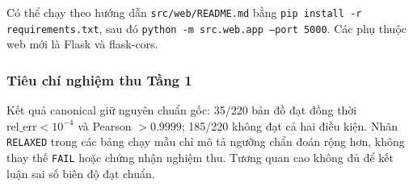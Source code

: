 Có thể chạy theo hướng dẫn \texttt{src/web/README.md} bằng
\texttt{pip install -r requirements.txt}, sau đó
\texttt{python -m src.web.app --port 5000}. Các phụ thuộc web mới là Flask và
flask-cors.

\subsubsection{Tiêu chí nghiệm thu Tầng 1}
Kết quả canonical giữ nguyên chuẩn gốc: 35/220 bản đồ đạt đồng thời
$\mathrm{rel\_err}<10^{-4}$ và Pearson $>0.9999$; 185/220 không đạt cả hai
điều kiện. Nhãn \texttt{RELAXED} trong các bảng chạy mẫu chỉ mô tả ngưỡng
chẩn đoán rộng hơn, không thay thế \texttt{FAIL} hoặc chứng nhận nghiệm thu.
Tương quan cao không đủ để kết luận sai số biên độ đạt chuẩn.
